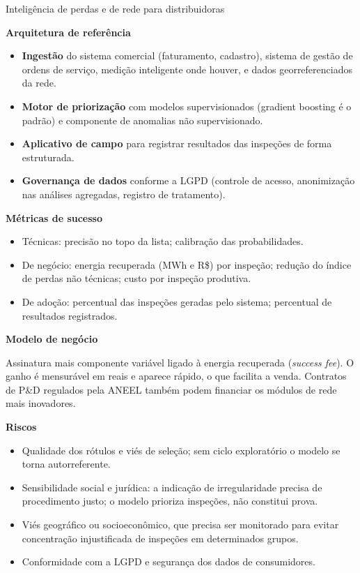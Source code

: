 \documentclass[11pt,a4paper]{article}
\newcommand{\prodsec}[1]{\par\medskip\noindent\textbf{\color{prodcolor}#1}\par\smallskip}
\begin{document}
\begin{produto}{Inteligência de perdas e de rede para distribuidoras}
\prodsec{Arquitetura de referência}
\begin{itemize}
  \item \textbf{Ingestão} do sistema comercial (faturamento, cadastro),
    sistema de gestão de ordens de serviço, medição inteligente onde houver, e
    dados georreferenciados da rede.
  \item \textbf{Motor de priorização} com modelos supervisionados (gradient
    boosting é o padrão) e componente de anomalias não supervisionado.
  \item \textbf{Aplicativo de campo} para registrar resultados das inspeções
    de forma estruturada.
  \item \textbf{Governança de dados} conforme a LGPD (controle de acesso,
    anonimização nas análises agregadas, registro de tratamento).
\end{itemize}

\prodsec{Métricas de sucesso}
\begin{itemize}
  \item Técnicas: precisão no topo da lista; calibração das probabilidades.
  \item De negócio: energia recuperada (MWh e R\$) por inspeção; redução do
    índice de perdas não técnicas; custo por inspeção produtiva.
  \item De adoção: percentual das inspeções geradas pelo sistema;
    percentual de resultados registrados.
\end{itemize}

\prodsec{Modelo de negócio}
Assinatura mais componente variável ligado à energia recuperada
(\textit{success fee}). O ganho é mensurável em reais e aparece rápido, o que
facilita a venda. Contratos de P\&D regulados pela ANEEL também podem
financiar os módulos de rede mais inovadores.

\prodsec{Riscos}
\begin{itemize}
  \item Qualidade dos rótulos e viés de seleção; sem ciclo exploratório o
    modelo se torna autorreferente.
  \item Sensibilidade social e jurídica: a indicação de irregularidade precisa
    de procedimento justo; o modelo prioriza inspeções, não constitui prova.
  \item Viés geográfico ou socioeconômico, que precisa ser monitorado para
    evitar concentração injustificada de inspeções em determinados grupos.
  \item Conformidade com a LGPD e segurança dos dados de consumidores.
\end{itemize}
\end{produto}
\end{document}
